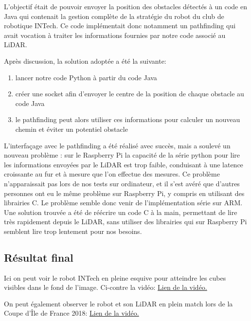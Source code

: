 \tab L'objectif était de pouvoir envoyer la position des obstacles détectés à un code en Java qui contenait la gestion complète de la stratégie du robot du club de robotique INTech. Ce code implémentait donc notamment un pathfinding qui avait vocation à traiter les informations fournies par notre code associé au LiDAR.  

Après discussion, la solution adoptée a été la suivante:
\begin{enumerate}
    \item lancer notre code Python à partir du code Java
    \item créer une socket afin d'envoyer le centre de la position de chaque obstacle au code Java
    \item le pathfinding peut alors utiliser ces informations pour calculer un nouveau chemin et éviter un potentiel obstacle
\end{enumerate}
\tab L'interfaçage avec le pathfinding a été réalisé avec succès, mais a soulevé un nouveau problème : sur le Raspberry Pi la capacité de la série python pour lire les informations envoyées par le LiDAR est trop faible, conduisant à une latence croissante au fur et à mesure que l'on effectue des mesures. Ce problème n'apparaissait pas lors de nos tests sur ordinateur, et il s'est avéré que d'autres personnes ont eu le même problème sur Raspberry Pi, y compris en utilisant des librairies C. Le problème semble donc venir de l'implémentation série sur ARM. Une solution trouvée a été de réécrire un code C à la main, permettant de lire très rapidement depuis le LiDAR, sans utiliser des librairies qui sur Raspberry Pi semblent lire trop lentement pour nos besoins.

\subsection{Résultat final}

\tab Ici on peut voir le robot INTech en pleine esquive pour atteindre les cubes visibles dans le fond de l'image. Ci-contre la vidéo:  \href{https://drive.google.com/open?id=1gUHL_6yfKHhAX55Kx0Wif0i2wZ0wc-EG}{Lien de la vidéo.}

On peut également observer le robot et son LiDAR en plein match lors de la Coupe d'Île de France 2018:
\href{https://drive.google.com/open?id=1vG5ts-w3lH8zYN6OM3irqqE8x8yshUWw}{Lien de la vidéo.}
